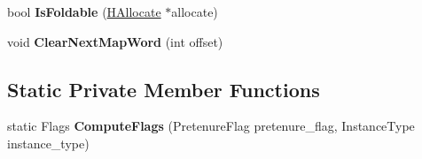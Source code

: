 \begin{DoxyCompactItemize}
\item 
bool {\bfseries Is\+Foldable} (\hyperlink{classv8_1_1internal_1_1_h_allocate}{H\+Allocate} $\ast$allocate)\hypertarget{classv8_1_1internal_1_1_h_allocate_aa7af305fda109c9778abe2286f98fd95}{}\label{classv8_1_1internal_1_1_h_allocate_aa7af305fda109c9778abe2286f98fd95}

\item 
void {\bfseries Clear\+Next\+Map\+Word} (int offset)\hypertarget{classv8_1_1internal_1_1_h_allocate_abef89f4cb57f63486a7a6f8596cae102}{}\label{classv8_1_1internal_1_1_h_allocate_abef89f4cb57f63486a7a6f8596cae102}

\end{DoxyCompactItemize}
\subsection*{Static Private Member Functions}
\begin{DoxyCompactItemize}
\item 
static Flags {\bfseries Compute\+Flags} (Pretenure\+Flag pretenure\+\_\+flag, Instance\+Type instance\+\_\+type)\hypertarget{classv8_1_1internal_1_1_h_allocate_a7aa9746fc00a27dc800189eb7e0b1949}{}\label{classv8_1_1internal_1_1_h_allocate_a7aa9746fc00a27dc800189eb7e0b1949}

\end{DoxyCompactItemize}
